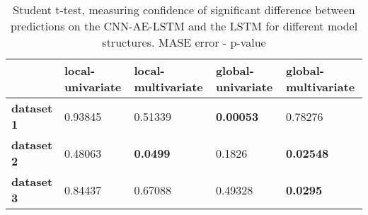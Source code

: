 \begin{table}[H]
\centering
\caption{Student t-test, measuring confidence of significant difference between predictions on the CNN-AE-LSTM and the LSTM for different model structures. MASE error - p-value}
\label{table:ttest-p-values-main-experiments-MASE}
\begin{tabular}{lllll}
\toprule
{} & local-univariate & local-multivariate & global-univariate & global-multivariate \\
\midrule
\textbf{dataset 1} &          0.93845 &            0.51339 &  \textbf{0.00053} &             0.78276 \\
\textbf{dataset 2} &          0.48063 &    \textbf{0.0499} &            0.1826 &    \textbf{0.02548} \\
\textbf{dataset 3} &          0.84437 &            0.67088 &           0.49328 &     \textbf{0.0295} \\
\bottomrule
\end{tabular}
\end{table}
